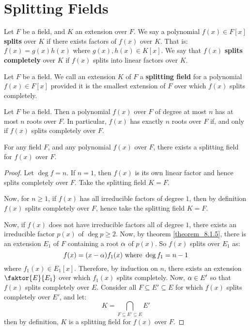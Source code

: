 \section{Splitting Fields}
\label{section_8.4}

\begin{definition}
  Let $F$ be a field, and $K$ an extension over $F$. We say a
  polynomial $f(x) \in F[x]$ \textbf{splits} over $K$ if there exists
  factors of $f(x)$ over $K$. That is:  $f(x)=g(x)h(x)$ where
  $g(x),h(x) \in K[x]$. We say that $f(x)$ \textbf{splits completely}
  over $K$ if $f(x)$ splits into linear factors over $K$.
\end{definition}

\begin{definition}
  Let $F$ be a field. We call an extension $K$ of $F$ a
  \textbf{splitting field} for a polynomial $f(x) \in F[x]$ provided
  it is the smallest extension of $F$ over which $f(x)$ splits
  completely.
\end{definition}

\begin{proposition}\label{proposition_8.4.1}
  Let $F$ be a field. Then a polynomial $f(x)$ over $F$ of degree at
  most $n$ has at most $n$ roots over $F$. In particular, $f(x)$ has
  exactly $n$ roots over $F$ if, and only if $f(x)$ splits completely
  over $F$.
\end{proposition}

\begin{theorem}\label{theorem_8.4.2}
  For any field $F$, and any polynomial $f(x)$ over $F$, there exists
  a splitting field for $f(x)$ over $F$.
\end{theorem}
\begin{proof}
  Let $\deg{f}=n$. If $n=1$, then $f(x)$ is its own linear factor and
  hence splits completely over $F$. Take the splitting field $K=F$.

  Now, for $n \geq 1$, if $f(x)$ has all irreducible factors of degree
  $1$, then by definition $f(x)$ splits completely over $F$, hence
  take the splitting field $K=F$.

  Now, if $f(x)$ does not have irreducible factors all of degree $1$,
  there exists an irreducible factor $p(x)$ of $\deg{p} \geq 2$. Now,
  by theorem \ref{theorem_8.1.5}, there is an extension $E_1$ of $F$
  containing a root  $\alpha$ of  $p(x)$. So $f(x)$ splits over $E_1$ as:
  \begin{equation*}
    f(x)=(x-\alpha)f_1(x) \text{ where } \deg{f_1}=n-1
  \end{equation*}
  where $f_1(x) \in E_1[x]$. Therefore, by induction on $n$, there
  exists an extension $\faktor{E}{E_1}$ over which $f_1(x)$ splits
  completely. Now, $\alpha \in E'$ so that $f(x)$ splits completely over
  $E$. Consider all $F \subseteq E' \subseteq E$ for which $f(x)$
  splits completely over $E'$, and let:
  \begin{equation*}
    K=\bigcap_{F \subseteq E' \subseteq E}{E'}
  \end{equation*}
  then by definition, $K$ is a splitting field for $f(x)$ over $F$.
\end{proof}

